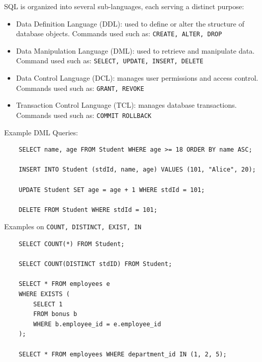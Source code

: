 \documentclass{article}
\begin{document}


SQL is organized into several sub-languages, each serving a distinct purpose:
\begin{itemize}
    \item Data Definition Language (DDL): used to define or alter the structure of database objects. Commands used such as: \texttt{CREATE, ALTER, DROP}
    \item Data Manipulation Language (DML): used to retrieve and manipulate data. Command used such as: \texttt{SELECT, UPDATE, INSERT, DELETE}
    \item Data Control Language (DCL): manages user permissions and access control. Commands used such as: \texttt{GRANT, REVOKE}
    \item Transaction Control Language (TCL): manages database transactions. Commands used such as: \texttt{COMMIT ROLLBACK}
\end{itemize}

Example DML Queries:
\begin{verbatim}
    SELECT name, age FROM Student WHERE age >= 18 ORDER BY name ASC;
    
    INSERT INTO Student (stdId, name, age) VALUES (101, "Alice", 20);
    
    UPDATE Student SET age = age + 1 WHERE stdId = 101;

    DELETE FROM Student WHERE stdId = 101;
\end{verbatim}

Examples on \texttt{COUNT, DISTINCT, EXIST, IN}
\begin{verbatim}
    SELECT COUNT(*) FROM Student;

    SELECT COUNT(DISTINCT stdID) FROM Student; 
    
    SELECT * FROM employees e
    WHERE EXISTS (
        SELECT 1
        FROM bonus b
        WHERE b.employee_id = e.employee_id
    );

    SELECT * FROM employees WHERE department_id IN (1, 2, 5);

\end{verbatim}
\end{document}
